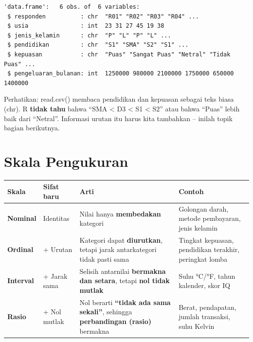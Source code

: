 \documentclass[
  indonesian,
  letterpaper,
]{book}
\newcounter{none} %
\begin{document}
\begin{verbatim}
'data.frame':   6 obs. of  6 variables:
 $ responden          : chr  "R01" "R02" "R03" "R04" ...
 $ usia               : int  23 31 27 45 19 38
 $ jenis_kelamin      : chr  "P" "L" "P" "L" ...
 $ pendidikan         : chr  "S1" "SMA" "S2" "S1" ...
 $ kepuasan           : chr  "Puas" "Sangat Puas" "Netral" "Tidak Puas" ...
 $ pengeluaran_bulanan: int  1250000 980000 2100000 1750000 650000 1400000
\end{verbatim}

Perhatikan: read.csv() membaca pendidikan dan kepuasan sebagai teks
biasa (chr). R \textbf{tidak tahu} bahwa ``SMA \textless{} D3
\textless{} S1 \textless{} S2'' atau bahwa ``Puas'' lebih baik dari
``Netral''. Informasi urutan itu harus kita tambahkan -- inilah topik
bagian berikutnya.

\section{Skala Pengukuran}\label{skala-pengukuran}

{\def\LTcaptype{none} %
\begin{longtable}[]{@{}
  >{\raggedright\arraybackslash}p{}
  >{\raggedright\arraybackslash}p{}
  >{\raggedright\arraybackslash}p{}
  >{\raggedright\arraybackslash}p{}@{}}
\toprule\noalign{}
\begin{minipage}[b]{\linewidth}\raggedright
Skala
\end{minipage} & \begin{minipage}[b]{\linewidth}\raggedright
Sifat baru
\end{minipage} & \begin{minipage}[b]{\linewidth}\raggedright
Arti
\end{minipage} & \begin{minipage}[b]{\linewidth}\raggedright
Contoh
\end{minipage} \\
\midrule\noalign{}
\endhead
\bottomrule\noalign{}
\endlastfoot
\textbf{Nominal} & Identitas & Nilai hanya \textbf{membedakan} kategori
& Golongan darah, metode pembayaran, jenis kelamin \\
\textbf{Ordinal} & + Urutan & Kategori dapat \textbf{diurutkan}, tetapi
jarak antarkategori tidak pasti sama & Tingkat kepuasan, pendidikan
terakhir, peringkat lomba \\
\textbf{Interval} & + Jarak sama & Selisih antarnilai \textbf{bermakna
dan setara}, tetapi \textbf{nol tidak mutlak} & Suhu °C/°F, tahun
kalender, skor IQ \\
\textbf{Rasio} & + Nol mutlak & Nol berarti \textbf{``tidak ada sama
sekali''}, sehingga \textbf{perbandingan (rasio)} bermakna & Berat,
pendapatan, jumlah transaksi, suhu Kelvin \\
\end{longtable}
}
\end{document}
